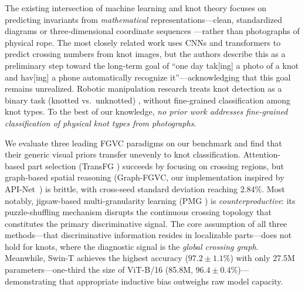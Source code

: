 \documentclass[preprint,review,12pt]{elsarticle}
\begin{document}
The existing intersection of machine learning and knot theory focuses on predicting invariants from \emph{mathematical} representations---clean, standardized diagrams or three-dimensional coordinate sequences \citep{vandans2020knots, hughes2020neural, craven2024illuminating, gukov2024rigor, grunbaum2022narrowing}---rather than photographs of physical rope. The most closely related work \citep{knotdetection2025} uses CNNs and transformers to predict crossing numbers from knot images, but the authors describe this as a preliminary step toward the long-term goal of ``one day tak[ing] a photo of a knot and hav[ing] a phone automatically recognize it''---acknowledging that this goal remains unrealized. Robotic manipulation research treats knot detection as a binary task (knotted vs.\ unknotted) \citep{sundaresan2020, grannen2020}, without fine-grained classification among knot types. To the best of our knowledge, \emph{no prior work addresses fine-grained classification of physical knot types from photographs}.

We evaluate three leading FGVC paradigms on our benchmark and find that their generic visual priors transfer unevenly to knot classification. Attention-based part selection (TransFG \citep{he2022transfg}) succeeds by focusing on crossing regions, but graph-based spatial reasoning (Graph-FGVC, our implementation inspired by API-Net~\citep{zhuang2020apinet}) is brittle, with cross-seed standard deviation reaching 2.84\%. Most notably, jigsaw-based multi-granularity learning (PMG \citep{du2020pmg}) is \emph{counterproductive}: its puzzle-shuffling mechanism disrupts the continuous crossing topology that constitutes the primary discriminative signal. The core assumption of all three methods---that discriminative information resides in localizable parts---does not hold for knots, where the diagnostic signal is the \emph{global crossing graph}. Meanwhile, Swin-T achieves the highest accuracy ($97.2 \pm 1.1\%$) with only 27.5M parameters---one-third the size of ViT-B/16 (85.8M, $96.4 \pm 0.4\%$)---demonstrating that appropriate inductive bias outweighs raw model capacity.
\end{document}
